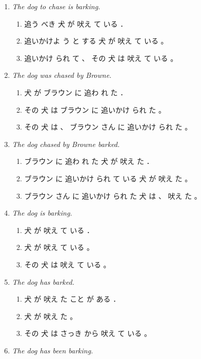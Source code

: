 \documentclass[a4paper,landscape,headrule,footrule,xetex]{foils}
\begin{document}
 \makexeCJKactive
\begin{enumerate}
\item \textit{The dog to chase is barking.}
  \begin{enumerate}
  \item 追う べき 犬 が 吠え て いる ．
  \item 追いかけよ う と する 犬 が 吠え て いる 。
  \item 追いかけ られ て 、 その 犬 は 吠え て いる 。 
  \end{enumerate}
\item \textit{The dog was chased by Browne.}
  \begin{enumerate}
  \item 犬 が ブラウン に 追わ れ た ．
  \item その 犬 は ブラウン に 追いかけ られ た 。
  \item その 犬 は 、 ブラウン さん に 追いかけ られ た 。
  \end{enumerate}
\newpage
\item \textit{The dog chased by Browne barked.}
  \begin{enumerate}
  \item ブラウン に 追わ れ た 犬 が 吠え た ．
  \item ブラウン に 追いかけ られ て いる 犬 が 吠え た 。
  \item ブラウン さん に 追いかけ られ た 犬 は 、 吠え た 。 
  \end{enumerate}
\item \textit{The dog is barking.}
  \begin{enumerate}
  \item 犬 が 吠え て いる ．
  \item 犬 が 吠え て いる 。
  \item その 犬 は 吠え て いる 。 
  \end{enumerate}
\item \textit{The dog has barked.}
  \begin{enumerate}
  \item 犬 が 吠え た こと が ある ．
  \item 犬 が 吠え た 。
  \item その 犬 は さっき から 吠え て いる 。 
  \end{enumerate}
\item \textit{The dog has been barking.}
  \begin{enumerate}

\end{enumerate}
\end{enumerate}
\end{document}
